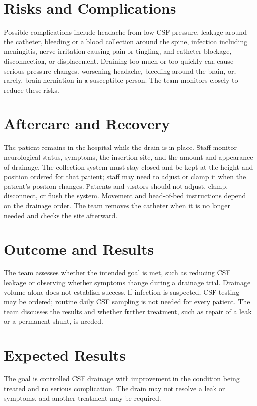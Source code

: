 \section*{Risks and Complications}
Possible complications include headache from low CSF pressure, leakage around the catheter, bleeding or a blood collection around the spine, infection including meningitis, nerve irritation causing pain or tingling, and catheter blockage, disconnection, or displacement. Draining too much or too quickly can cause serious pressure changes, worsening headache, bleeding around the brain, or, rarely, brain herniation in a susceptible person. The team monitors closely to reduce these risks.

\section*{Aftercare and Recovery}
The patient remains in the hospital while the drain is in place. Staff monitor neurological status, symptoms, the insertion site, and the amount and appearance of drainage. The collection system must stay closed and be kept at the height and position ordered for that patient; staff may need to adjust or clamp it when the patient's position changes. Patients and visitors should not adjust, clamp, disconnect, or flush the system. Movement and head-of-bed instructions depend on the drainage order. The team removes the catheter when it is no longer needed and checks the site afterward.

\section*{Outcome and Results}
The team assesses whether the intended goal is met, such as reducing CSF leakage or observing whether symptoms change during a drainage trial. Drainage volume alone does not establish success. If infection is suspected, CSF testing may be ordered; routine daily CSF sampling is not needed for every patient. The team discusses the results and whether further treatment, such as repair of a leak or a permanent shunt, is needed.

\section*{Expected Results}
The goal is controlled CSF drainage with improvement in the condition being treated and no serious complication. The drain may not resolve a leak or symptoms, and another treatment may be required.

